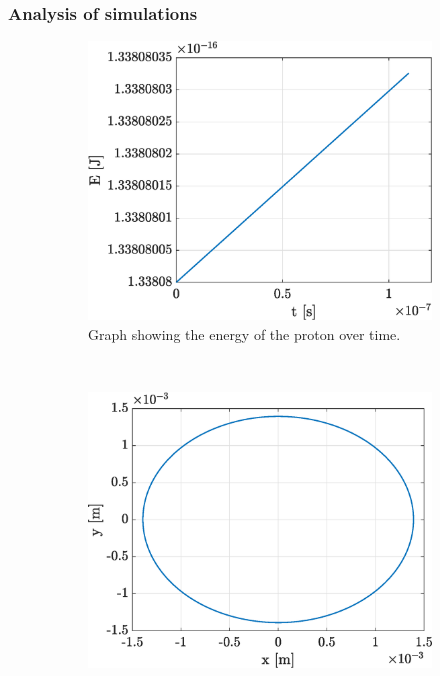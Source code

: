 \documentclass[a4paper,12pt,twoside]{article}
\begin{document}
\subsubsection{Analysis of simulations}
\begin{figure}[h]
\begin{subfigure}[t]{0.32\textwidth}
	\includegraphics[width=\textwidth]{graphs/app1_ii_ene.eps}
	\caption{Graph showing the energy of the proton over time.}
	\label{fig:app1-ii-ene}
\end{subfigure}
~
\begin{subfigure}[t]{0.32\textwidth}
	\includegraphics[width=\textwidth]{graphs/app1_ii_traj.eps}

\end{subfigure}
\end{figure}
\end{document}
